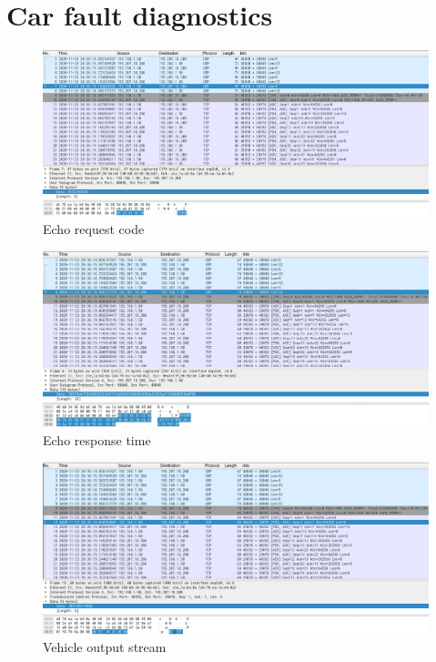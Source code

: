 \documentclass[12pt, a4paper]{article}
\begin{document}
\section{Car fault diagnostics}

\begin{figure}[h!]
\centering
	\includegraphics[height=.4\textheight, width=\textwidth, keepaspectratio]{assets/wireshark/vehicle1.png}
	\caption{Echo request code} 
\end{figure}

\pagebreak
\begin{figure}[h!]
\centering
	\includegraphics[height=.4\textheight, width=\textwidth, keepaspectratio]{assets/wireshark/vehicle2.png}
	\caption{Echo response time} 
\end{figure}

\begin{figure}[h!]
\centering
	\includegraphics[height=.4\textheight, width=\textwidth, keepaspectratio]{assets/wireshark/vehicle3.png}
	\caption{Vehicle output stream} 
\end{figure}
\end{document}
